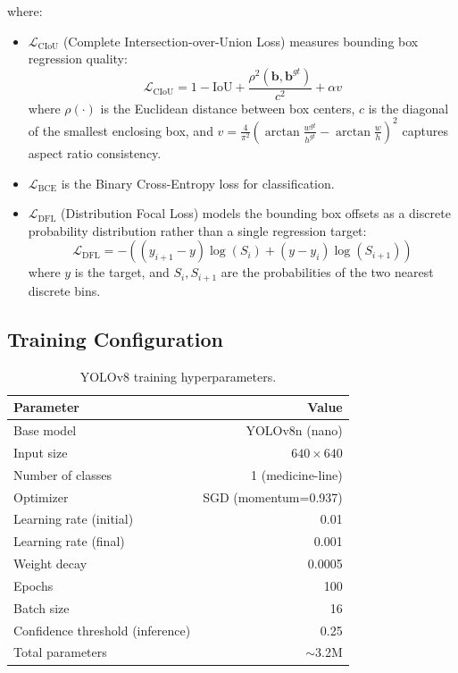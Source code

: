 \documentclass[12pt,a4paper,oneside]{report}
\begin{document}
where:
\begin{itemize}
  \item $\mathcal{L}_{\text{CIoU}}$ (Complete Intersection-over-Union Loss) measures bounding box regression quality:
  \begin{equation}
  \mathcal{L}_{\text{CIoU}} = 1 - \text{IoU} + \frac{\rho^2(\mathbf{b}, \mathbf{b}^{gt})}{c^2} + \alpha v
  \end{equation}
  where $\rho(\cdot)$ is the Euclidean distance between box centers, $c$ is the diagonal of the smallest enclosing box, and $v = \frac{4}{\pi^2}\left(\arctan\frac{w^{gt}}{h^{gt}} - \arctan\frac{w}{h}\right)^2$ captures aspect ratio consistency.

  \item $\mathcal{L}_{\text{BCE}}$ is the Binary Cross-Entropy loss for classification.

  \item $\mathcal{L}_{\text{DFL}}$ (Distribution Focal Loss) models the bounding box offsets as a discrete probability distribution rather than a single regression target:
  \begin{equation}
  \mathcal{L}_{\text{DFL}} = -\left((y_{i+1} - y) \log(S_i) + (y - y_i) \log(S_{i+1})\right)
  \end{equation}
  where $y$ is the target, and $S_i, S_{i+1}$ are the probabilities of the two nearest discrete bins.
\end{itemize}

\subsection{Training Configuration}

\begin{table}[H]
\centering
\caption{YOLOv8 training hyperparameters.}
\label{tab:yolo_hyperparams}
\begin{tabular}{l r}
\toprule
\textbf{Parameter} & \textbf{Value} \\
\midrule
Base model & YOLOv8n (nano) \\
Input size & $640 \times 640$ \\
Number of classes & 1 (medicine-line) \\
Optimizer & SGD (momentum=0.937) \\
Learning rate (initial) & 0.01 \\
Learning rate (final) & 0.001 \\
Weight decay & 0.0005 \\
Epochs & 100 \\
Batch size & 16 \\
Confidence threshold (inference) & 0.25 \\
Total parameters & $\sim$3.2M \\
\bottomrule
\end{tabular}
\end{table}
\end{document}
